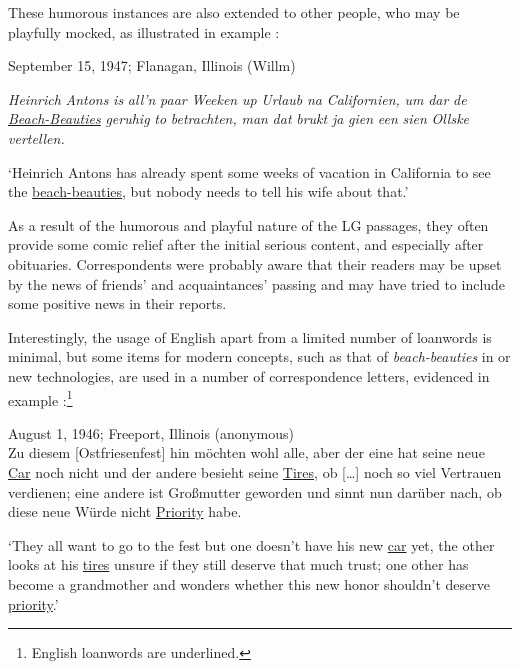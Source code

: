 \documentclass[output=paper]{langsci/langscibook}
\begin{document}
These humorous instances are also extended to other people, who may be playfully mocked, as illustrated in example :

 
\ea
\label{ex:rocker:13} 
September 15, 1947; Flanagan, Illinois (Willm)\smallskip\\\relax 
 
\textit{Heinrich} \textit{Antons} \textit{is} \textit{all’n} \textit{paar} \textit{Weeken} \textit{up} \textit{Urlaub} \textit{na} \textit{Californien,} \textit{um} \textit{dar} \textit{de} \underline{\textit{Beach-}\textit{Beauties}} \textit{geruhig} \textit{to} \textit{betrachten,} \textit{man} \textit{dat} \textit{brukt} \textit{ja} \textit{gien} \textit{een} \textit{sien} \textit{Ollske} \textit{vertellen.}\smallskip\\\relax 

‘Heinrich Antons has already spent some weeks of vacation in California to see the \underline{beach-beauties}, but nobody needs to tell his wife about that.’
\z

As a result of the humorous and playful nature of the LG passages, they often provide some comic relief after the initial serious content, and especially after obituaries. Correspondents were probably aware that their readers may be upset by the news of friends’ and acquaintances’ passing and may have tried to include some positive news in their reports. 

Interestingly, the usage of English apart from a limited number of loanwords is minimal, but some items for modern concepts, such as that of \textit{beach-beauties} in  or new technologies, are used in a number of correspondence letters, evidenced in example :\footnote{English loanwords are underlined.}
 
\ea
\label{ex:rocker:14} 
August 1, 1946; Freeport, Illinois (anonymous) \smallskip\\\relax 
Zu diesem [Ostfriesenfest] hin möchten wohl alle, aber der eine hat seine neue \underline{Car} noch nicht und der andere besieht seine \underline{Tires}, ob […] noch so viel Vertrauen verdienen; eine andere ist Großmutter geworden und sinnt nun darüber nach, ob diese neue Würde nicht \underline{Priority} habe.\smallskip\\\relax 

‘They all want to go to the fest but one doesn’t have his new \underline{car} yet, the other looks at his \underline{tires} unsure if they still deserve that much trust; one other has become a grandmother and wonders whether this new honor shouldn’t deserve \underline{priority}.'
\z 
\end{document}
